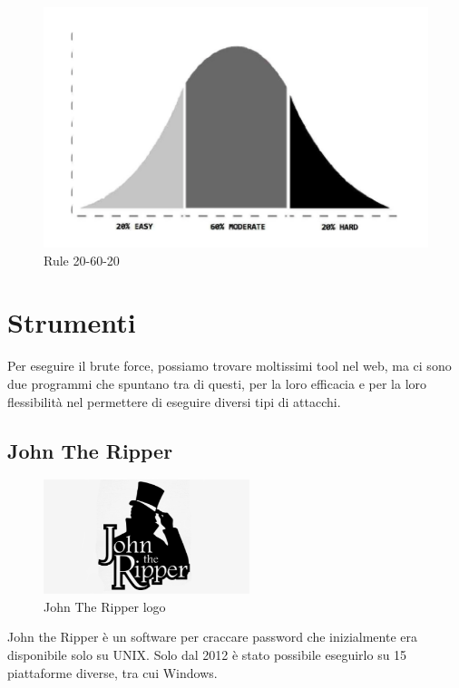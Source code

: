 \begin{figure}[htpb!]
    \centering
    \includegraphics[width=\linewidth]{Immagini/introduzione/20-60-20.png}
    \caption{Rule 20-60-20 \cite{hashcrack}}
    \label{fig:rocker}
\end{figure}

\section{Strumenti}

Per eseguire il brute force, possiamo trovare moltissimi tool nel web, ma ci sono due programmi che spuntano tra di questi, per la loro efficacia e per la loro flessibilità nel permettere di eseguire diversi tipi di attacchi.

\subsection{John The Ripper}

\begin{figure}[htpb!]
    \centering
    \includegraphics[width=60mm]{Immagini/1/john.png}
    \caption{John The Ripper logo}
\end{figure}

John the Ripper \cite{John_The_Ripper} è un software per craccare password che inizialmente era disponibile solo su UNIX. Solo dal 2012 è stato possibile eseguirlo su 15 piattaforme diverse, tra cui Windows.

